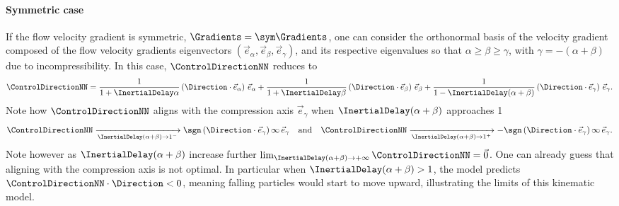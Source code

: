 \paragraph{Symmetric case}
If the flow velocity gradient is symmetric, $\Gradients = \sym \Gradients$, one can consider the orthonormal basis of the velocity gradient composed of the flow velocity gradients eigenvectors $(\vec{e}_\alpha, \vec{e}_\beta, \vec{e}_\gamma)$, and its respective eigenvalues so that $\alpha \ge \beta \ge \gamma$, with $\gamma = -(\alpha + \beta)$ due to incompressibility.
In this case, $\ControlDirectionNN$ reduces to
\begin{equation}\label{eq:kinematic_sym_n}
	\ControlDirectionNN = \frac{1}{1 + \InertialDelay \alpha} \left( \Direction \cdot \vec{e}_\alpha \right) \, \vec{e}_\alpha + \frac{1}{1 + \InertialDelay \beta} \left( \Direction \cdot \vec{e}_\beta \right) \, \vec{e}_\beta + \frac{1}{1 - \InertialDelay (\alpha + \beta)} \left( \Direction \cdot \vec{e}_\gamma \right) \, \vec{e}_\gamma.
\end{equation}
Note how $\ControlDirectionNN$ aligns with the compression axis $\vec{e}_\gamma$ when $\InertialDelay (\alpha + \beta)$ approaches 1
\begin{equation}\label{eq:kinematic_sym_n_lim}
	\ControlDirectionNN \xrightarrow[\InertialDelay (\alpha + \beta) \to 1^-]{} \sgn \left( \Direction \cdot \vec{e}_\gamma \right) \infty \, \vec{e}_\gamma \quad \text{and} \quad \ControlDirectionNN \xrightarrow[\InertialDelay (\alpha + \beta) \to 1^+]{} -\sgn \left( \Direction \cdot \vec{e}_\gamma \right) \infty \, \vec{e}_\gamma.
\end{equation}
Note however as $\InertialDelay (\alpha + \beta)$ increase further $\lim_{\InertialDelay (\alpha + \beta) \to +\infty} \ControlDirectionNN = \vec{0}$.
One can already guess that aligning with the compression axis is not optimal.
In particular when $\InertialDelay (\alpha + \beta) > 1$, the model predicts $\ControlDirectionNN \cdot \Direction < 0$, meaning falling particles would start to move upward, illustrating the limits of this kinematic model.


